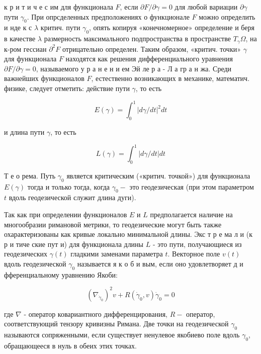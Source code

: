 \documentclass[10pt]{article}
\begin{document}
к р и т и ч е с им для функционала $F$, если $\partial F / \partial \gamma=0$ для любой вариации $\partial \gamma$ пути $\gamma_{0}$. При опрсделенных предположениях о функционале $F$ можно определить и нде к с $\lambda$ критич. пути $\gamma_{0}$, опять копируя «конечномерное» определение и беря в качестве $\lambda$ размерность максимального подпространства в пространстве $T_{\gamma} \Omega$, на к-ром гессиан $\partial^{2} F$ отрицательно определен. Таким образом, «критич. точки» $\gamma$ для функционала $F$ находятся как решения дифференциального уравнения $\partial F / \partial \gamma=0$, называемого у р а н е н и ем Эй ле р а - Л а гр а н жа. Среди важнейших функционалов $F$, естественно возникающих в механике, математич. физике, следует отметить: действие пути $\gamma$, то есть



\[

E(\gamma)=\int_{0}^{1}|d \gamma / d t|^{2} d t

\]



и длина пути $\gamma$, то есть



\[

L(\gamma)=\int_{0}^{1}|d \gamma / d t| d t

\]



Т е о рема. Путь $\gamma_{0}$ является критическим («критич. точкой») для функционала $E(\gamma)$ тогда и только тогда, когда $\gamma_{0}-$ это геодезическая (при этом параметром $t$ вдоль геодезической служит длина дуги).



Так как при определении функционалов $E$ и $L$ предполагается наличие на многообразии римановой метрики, то геодезические могут быть также охарактеризованы как кривые локально минимальной длины. Экс т р е ма л и (к р и тиче ские пут и) для функционала длины $L$ - это пути, получающиеся из геодезических $\gamma(t)$ гладкими заменами параметра $t$. Векторное поле $v(t)$ вдоль геодезической $\gamma_{0}$ называется я к о б и вым, если оно удовлетворяет д и фференциальному уравнению Якоби:



\[

\left(\nabla_{\dot{\gamma}_{0}}\right)^{2} v+R\left(\dot{\gamma}_{0}, v\right) \dot{\gamma}_{0}=0

\]



где $\nabla$ - оператор ковариантного дифференцирования, $R-$ оператор, соответствующий тензору кривизны Римана. Две точки на геодезической $\gamma_{0}$ называются сопряженными, если существует ненулевое якобиево поле вдоль $\gamma_{0}$, обращающееся в нуль в обеих этих точках.
\end{document}
